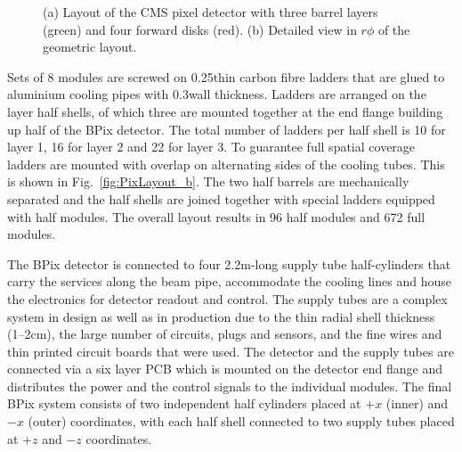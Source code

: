 \begin{figure}[!htb]
 \begin{center}
 \end{center}
 \caption{(a) Layout of the CMS pixel detector with three barrel layers (green) and four forward disks (red). (b) Detailed view in $r\phi$ of the geometric layout.}
 \label{fig:PixLayout}
\end{figure}

Sets of 8 modules are screwed on 0.25\mm thin carbon fibre ladders that are glued to aluminium cooling pipes with 0.3\mm wall thickness.
Ladders are arranged on the layer half shells, of which three are mounted together at the end flange building up half of the BPix detector.
The total number of ladders per half shell is 10 for layer 1, 16 for layer 2 and 22 for layer 3.
To guarantee full spatial coverage ladders are mounted with overlap on alternating sides of the cooling tubes. This is shown in Fig.~\ref{fig:PixLayout_b}.
The two half barrels are mechanically separated and the half shells are joined together with special ladders equipped with half modules.
The overall layout results in 96 half modules and 672 full modules.

The BPix detector is connected to four 2.2\unit{m}-long supply tube half-cylinders that carry the services along the beam pipe, accommodate the cooling lines and house the electronics for detector readout and control. The supply tubes are a complex system in design as well as in production due to the thin radial shell thickness (1--2\unit{cm}), the large number of circuits, plugs and sensors, and the fine wires and thin printed circuit boards that were used. The detector and the supply tubes are connected via a six layer PCB which is mounted on the detector end flange and distributes the power and the control signals to the individual modules.
The final BPix system consists of two independent half cylinders placed at $+x$ (inner) and $-x$ (outer) coordinates,
with each half shell connected to two supply tubes placed at $+z$ and $-z$ coordinates.

